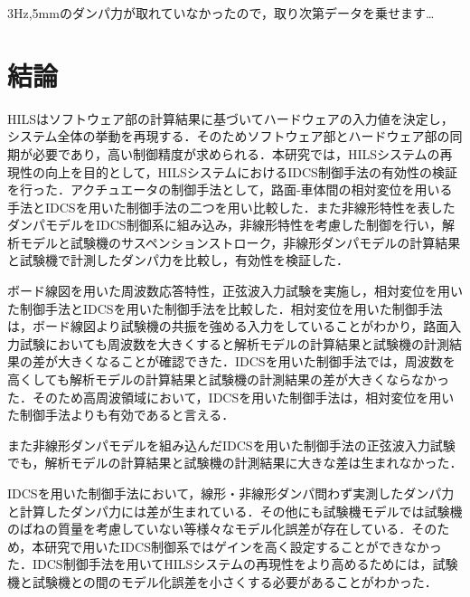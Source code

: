 \documentclass[a4paper,12pt]{article_vdlab_sotsuron}
\begin{document}
3Hz,5mmのダンパ力が取れていなかったので，取り次第データを乗せます…

\newpage
\section{結論}
HILSはソフトウェア部の計算結果に基づいてハードウェアの入力値を決定し，システム全体の挙動を再現する．そのためソフトウェア部とハードウェア部の同期が必要であり，高い制御精度が求められる．本研究では，HILSシステムの再現性の向上を目的として，HILSシステムにおけるIDCS制御手法の有効性の検証を行った．アクチュエータの制御手法として，路面-車体間の相対変位を用いる手法とIDCSを用いた制御手法の二つを用い比較した．また非線形特性を表したダンパモデルをIDCS制御系に組み込み，非線形特性を考慮した制御を行い，解析モデルと試験機のサスペンションストローク，非線形ダンパモデルの計算結果と試験機で計測したダンパ力を比較し，有効性を検証した．

ボード線図を用いた周波数応答特性，正弦波入力試験を実施し，相対変位を用いた制御手法とIDCSを用いた制御手法を比較した．相対変位を用いた制御手法は，ボード線図より試験機の共振を強める入力をしていることがわかり，路面入力試験においても周波数を大きくすると解析モデルの計算結果と試験機の計測結果の差が大きくなることが確認できた．IDCSを用いた制御手法では，周波数を高くしても解析モデルの計算結果と試験機の計測結果の差が大きくならなかった．そのため高周波領域において，IDCSを用いた制御手法は，相対変位を用いた制御手法よりも有効であると言える．

また非線形ダンパモデルを組み込んだIDCSを用いた制御手法の正弦波入力試験でも，解析モデルの計算結果と試験機の計測結果に大きな差は生まれなかった．

IDCSを用いた制御手法において，線形・非線形ダンパ問わず実測したダンパ力と計算したダンパ力には差が生まれている．その他にも試験機モデルでは試験機のばねの質量を考慮していない等様々なモデル化誤差が存在している．そのため，本研究で用いたIDCS制御系ではゲインを高く設定することができなかった．IDCS制御手法を用いてHILSシステムの再現性をより高めるためには，試験機と試験機との間のモデル化誤差を小さくする必要があることがわかった．
\end{document}
